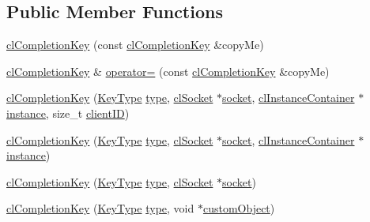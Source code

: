 \subsection*{Public Member Functions}
\begin{DoxyCompactItemize}
\item 
\hyperlink{classcl_completion_key_a95903e6444e6435ac236c60131d6d917}{clCompletionKey} (const \hyperlink{classcl_completion_key}{clCompletionKey} \&copyMe)
\item 
\hyperlink{classcl_completion_key}{clCompletionKey} \& \hyperlink{classcl_completion_key_ad7139d10d631de3c7f0f50c4c5983fc1}{operator=} (const \hyperlink{classcl_completion_key}{clCompletionKey} \&copyMe)
\item 
\hyperlink{classcl_completion_key_a205196a46b952185a31482b26c527325}{clCompletionKey} (\hyperlink{classcl_completion_key_a3a2147c7a8a50fc3333cee949105ab12}{KeyType} \hyperlink{classcl_completion_key_aa63f9e5342dac65b56fab6a424065aa9}{type}, \hyperlink{classcl_socket}{clSocket} $\ast$\hyperlink{classcl_completion_key_a96e8a44f37704779a1715f72fd712da2}{socket}, \hyperlink{classcl_instance_container}{clInstanceContainer} $\ast$\hyperlink{classcl_completion_key_aa35aa701d8a009f709509ba26ead3275}{instance}, size\_\-t \hyperlink{classcl_completion_key_a512eecc783be96d6afe9a75c05c1ff18}{clientID})
\item 
\hyperlink{classcl_completion_key_a041c3dce020210e4b559f1272e9ebf32}{clCompletionKey} (\hyperlink{classcl_completion_key_a3a2147c7a8a50fc3333cee949105ab12}{KeyType} \hyperlink{classcl_completion_key_aa63f9e5342dac65b56fab6a424065aa9}{type}, \hyperlink{classcl_socket}{clSocket} $\ast$\hyperlink{classcl_completion_key_a96e8a44f37704779a1715f72fd712da2}{socket}, \hyperlink{classcl_instance_container}{clInstanceContainer} $\ast$\hyperlink{classcl_completion_key_aa35aa701d8a009f709509ba26ead3275}{instance})
\item 
\hyperlink{classcl_completion_key_aab59e78af43eb35a62728d95a1e4d244}{clCompletionKey} (\hyperlink{classcl_completion_key_a3a2147c7a8a50fc3333cee949105ab12}{KeyType} \hyperlink{classcl_completion_key_aa63f9e5342dac65b56fab6a424065aa9}{type}, \hyperlink{classcl_socket}{clSocket} $\ast$\hyperlink{classcl_completion_key_a96e8a44f37704779a1715f72fd712da2}{socket})
\item 
\hyperlink{classcl_completion_key_ac844abb5caf7c19a8a05e074f6438b64}{clCompletionKey} (\hyperlink{classcl_completion_key_a3a2147c7a8a50fc3333cee949105ab12}{KeyType} \hyperlink{classcl_completion_key_aa63f9e5342dac65b56fab6a424065aa9}{type}, void $\ast$\hyperlink{classcl_completion_key_ab1ef70c4d8194b9fd32f502dead2a371}{customObject})

\end{DoxyCompactItemize}
